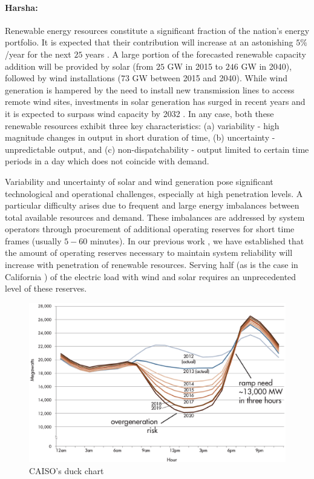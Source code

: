 \documentclass[11pt,a4paper]{article}
\newcommand{\gap}{\vspace{5pt}}
\begin{document}
\paragraph{Harsha:} Renewable energy resources constitute a significant fraction of the nation's energy portfolio. It is expected that their contribution will increase at an astonishing $5\%$/year for the next $25$ years \cite{AEO2016}. A large portion of the forecasted renewable capacity addition will be provided by solar (from $25$ GW in 2015 to $246$ GW in 2040), followed by wind installations ($73$ GW between 2015 and 2040). While wind generation is hampered by the need to install new transmission lines to access remote wind sites, investments in solar generation has surged in recent years and it is expected to surpass wind capacity by 2032 \cite{AEO2016}. In any case, both these renewable resources exhibit three key characteristics: (a) variability - high magnitude changes in output in short duration of time, (b) uncertainty - unpredictable output, and (c) non-dispatchability - output limited to certain time periods in a day which does not coincide with demand. 

\gap{}

Variability and uncertainty of solar and wind generation pose significant technological and operational challenges, especially at high penetration levels. A particular difficulty arises due to frequent and large energy imbalances between total available resources and demand. These imbalances are addressed by system operators through procurement of additional operating reserves for short time frames (usually $5-60$ minutes). In our previous work \cite{Gang16a}, we have established that the amount of operating reserves necessary to maintain system reliability will increase with penetration of renewable resources. Serving half (as is the case in California \cite{SB350}) of the electric load with wind and solar requires an unprecedented level of these reserves. 

\gap

\begin{figure}
\centering
\vspace*{-0.6cm}
\includegraphics[scale=0.2]{./figures/duckChart}
\caption{CAISO's duck chart} \label{fig:duck}
\end{figure}
\end{document}
